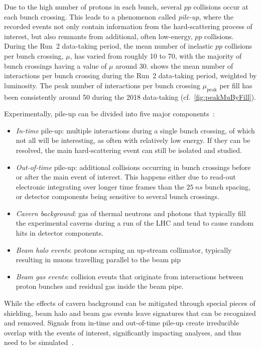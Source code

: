 Due to the high number of protons in each bunch, several $pp$ collisions occur at each bunch crossing. This leads to a phenomenon called \textit{pile-up}, where the recorded events not only contain information from the hard-scattering process of interest, but also remnants from additional, often low-energy, $pp$ collisions. During the Run~2 data-taking period, the mean number of inelastic $pp$ collisions per bunch crossing, $\mu$, has varied from roughly 10 to 70, with the majority of bunch crossings having a value of $\mu$ around 30.  shows the mean number of interactions per bunch crossing during the Run~2 data-taking period, weighted by luminosity. The peak number of interactions per bunch crossing $\mu_\mathrm{peak}$ per fill has been consistently around 50 during the 2018 data-taking (cf.~\cref{fig:peakMuByFill}).

Experimentally, pile-up can be divided into five major components~\cite{Marshall:2014mza}:
\begin{itemize}
	\item \textit{In-time} pile-up: multiple interactions during a single bunch crossing, of which not all will be interesting, as often with relatively low energy. If they can be resolved, the main hard-scattering event can still be isolated and studied.
	\item \textit{Out-of-time} pile-up: additional collisions occurring in bunch crossings before or after the main event of interest. This happens either due to read-out electronic integrating over longer time frames than the $\SI{25}{ns}$ bunch spacing, or detector components being sensitive to several bunch crossings.
	\item \textit{Cavern background}: gas of thermal neutrons and photons that typically fill the experimental caverns during a run of the LHC and tend to cause random hits in detector components.
	\item \textit{Beam halo events}: protons scraping an up-stream collimator, typically resulting in muons travelling parallel to the beam pip
	\item \textit{Beam gas events}: collision events that originate from interactions between proton bunches and residual gas inside the beam pipe.
\end{itemize}
While the effects of cavern background can be mitigated through special pieces of shielding, beam halo and beam gas events leave signatures that can be recognized and removed. Signals from in-time and out-of-time pile-up create irreducible overlap with the events of interest, significantly impacting analyses, and thus need to be simulated~\cite{Marshall:2014mza}.

